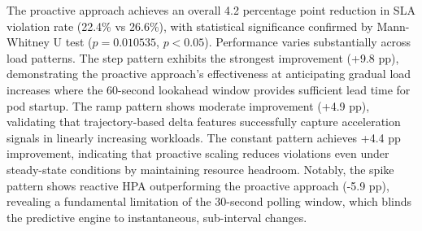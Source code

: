 \documentclass[conference]{IEEEtran}
\begin{document}
The proactive approach achieves an overall 4.2 percentage point reduction in SLA violation rate (22.4\% vs 26.6\%), with statistical significance confirmed by Mann-Whitney U test ($p = 0.010535$, $p < 0.05$). Performance varies substantially across load patterns. The step pattern exhibits the strongest improvement (+9.8 pp), demonstrating the proactive approach's effectiveness at anticipating gradual load increases where the 60-second lookahead window provides sufficient lead time for pod startup. The ramp pattern shows moderate improvement (+4.9 pp), validating that trajectory-based delta features successfully capture acceleration signals in linearly increasing workloads. The constant pattern achieves +4.4 pp improvement, indicating that proactive scaling reduces violations even under steady-state conditions by maintaining resource headroom. Notably, the spike pattern shows reactive HPA outperforming the proactive approach (-5.9 pp), revealing a fundamental limitation of the 30-second polling window, which blinds the predictive engine to instantaneous, sub-interval changes.
\end{document}
